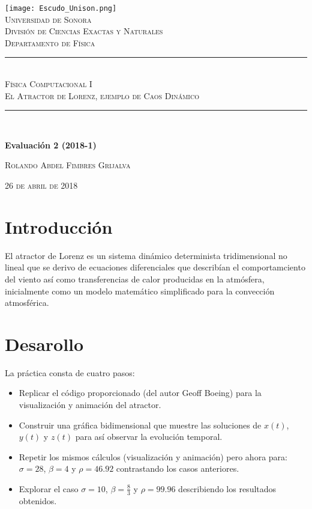 \documentclass{article}
\newcommand{\HRule}{\rule{\linewidth}{0.5mm}}
\begin{document}
\begin{center}

\texttt{[image: Escudo\_Unison.png]}~\\[1cm]

\textsc{\LARGE Universidad de Sonora}\\[0.1cm]
\textsc{División de Ciencias Exactas y Naturales}\\[0.1cm]
\textsc{Departamento de Física}\\[1.5cm]

\HRule \\[0.4cm]
\textsc{Física Computacional I\\[0.1cm]}
\textsc{El Atractor de Lorenz, ejemplo de Caos Dinámico}\\[0.1cm]
\HRule \\[1.5cm]
\begin{center}
	\textbf{Evaluación 2 (2018-1)}
\end{center}

\textsc{Rolando Abdel Fimbres Grijalva \\[0.5cm]}

\vfill
\textsc{26 de abril de 2018\\[0.1cm]}
\end{center}
\pagebreak
\section{Introducción}
El atractor de Lorenz es un sistema dinámico determinista tridimensional no lineal que se derivo de ecuaciones diferenciales que describían el comportamciento del viento así como transferencias de calor producidas en la atmósfera, inicialmente como un modelo matemático simplificado para la convección atmosférica. 
\section{Desarollo}
La práctica consta de cuatro pasos:\\
\begin{itemize}
\item Replicar el código proporcionado (del autor Geoff Boeing) para la visualización y animación del atractor.\\
\item Construir una gráfica bidimensional que muestre las soluciones de $x(t)$, $y(t)$ y $z(t)$ para así observar la evolución temporal.
\item Repetir los mismos cálculos (visualización y animación) pero ahora para: $\sigma=28$, $\beta=4$ y $\rho=46.92$ contrastando los casos anteriores.
\item Explorar el caso $\sigma=10$, $\beta=\frac{8}{3}$ y $\rho=99.96$ describiendo los resultados obtenidos. 
\end{itemize}
\end{document}
